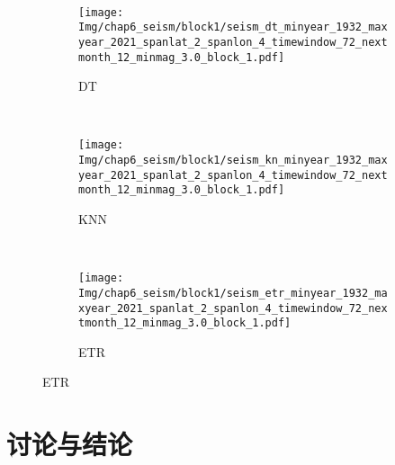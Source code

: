 \begin{figure}[!htbp]
\begin{subfigure}[b]{0.45\textwidth}
    \vspace{-1cm}
    \label{fig:seism_gbr_minyear_1932_maxyear_2021_spanlat_2_spanlon_4_timewindow_72_nextmonth_12_minmag_3.0_block_1}
  \end{subfigure}
  ~
  \begin{subfigure}[b]{0.45\textwidth}
    \caption{DT}
    \vspace{-0.2cm}
    \texttt{[image: Img/chap6\_seism/block1/seism\_dt\_minyear\_1932\_maxyear\_2021\_spanlat\_2\_spanlon\_4\_timewindow\_72\_nextmonth\_12\_minmag\_3.0\_block\_1.pdf]}
    \vspace{-1cm}
    \label{fig:seism_dt_minyear_1932_maxyear_2021_spanlat_2_spanlon_4_timewindow_72_nextmonth_12_minmag_3.0_block_1}
  \end{subfigure}
  \\
  \begin{subfigure}[b]{0.45\textwidth}
    \caption{KNN}
    \vspace{-0.2cm}
    \texttt{[image: Img/chap6\_seism/block1/seism\_kn\_minyear\_1932\_maxyear\_2021\_spanlat\_2\_spanlon\_4\_timewindow\_72\_nextmonth\_12\_minmag\_3.0\_block\_1.pdf]}
    \vspace{-1cm}
    \label{fig:seism_knn_minyear_1932_maxyear_2021_spanlat_2_spanlon_4_timewindow_72_nextmonth_12_minmag_3.0_block_1}
  \end{subfigure}
  ~
  \begin{subfigure}[b]{0.45\textwidth}
    \caption{ETR}
    \vspace{-0.2cm}
    \texttt{[image: Img/chap6\_seism/block1/seism\_etr\_minyear\_1932\_maxyear\_2021\_spanlat\_2\_spanlon\_4\_timewindow\_72\_nextmonth\_12\_minmag\_3.0\_block\_1.pdf]}
    \vspace{-1cm}
    \label{fig:seism_etr_minyear_1932_maxyear_2021_spanlat_2_spanlon_4_timewindow_72_nextmonth_12_minmag_3.0_block_1}
  \end{subfigure}
  \label{fig:seism_minyear_1932_maxyear_2021_spanlat_2_spanlon_4_timewindow_72_nextmonth_12_minmag_3.0_block_1}
\end{figure}




\section{讨论与结论}\label{sec:seism_conclusion}

